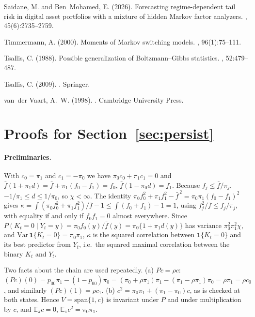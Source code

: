 \documentclass[12pt,letterpaper]{article}
\newcommand{\E}{\mathbb{E}}
\theoremstyle{plain}
\theoremstyle{remark}
\begin{document}
\begin{thebibliography}{}
Saidane, M. and Ben~Mohamed, E. (2026).
\newblock Forecasting regime-dependent tail risk in digital asset portfolios
  with a mixture of hidden {M}arkov factor analyzers.
, 45(6):2735--2759.

Timmermann, A. (2000).
\newblock Moments of {M}arkov switching models.
, 96(1):75--111.

Tsallis, C. (1988).
\newblock Possible generalization of {B}oltzmann--{G}ibbs statistics.
, 52:479--487.

Tsallis, C. (2009).
.
\newblock Springer.

van~der Vaart, A.~W. (1998).
.
\newblock Cambridge University Press.

\end{thebibliography}

\appendix
\section{Proofs for Section~\ref{sec:persist}}\label{app:C}

\paragraph{Preliminaries.} With $c_0=\pi_1$ and $c_1=-\pi_0$ we have $\pi_0c_0+\pi_1c_1=0$ and $\bar f(1+\pi_1d)=\bar f+\pi_1(f_0-f_1)=f_0$, $\bar f(1-\pi_0d)=f_1$. Because $f_j\le\bar f/\pi_j$, $-1/\pi_1\le d\le1/\pi_0$, so $\chi<\infty$. The identity $\pi_0f_0^2+\pi_1f_1^2-\bar f^{\,2}=\pi_0\pi_1(f_0-f_1)^2$ gives $\kappa=\int(\pi_0f_0^2+\pi_1f_1^2)/\bar f-1\le\int(f_0+f_1)-1=1$, using $f_j^2/\bar f\le f_j/\pi_j$, with equality if and only if $f_0f_1=0$ almost everywhere. Since $P(K_t=0\mid Y_t=y)=\pi_0f_0(y)/\bar f(y)=\pi_0\{1+\pi_1d(y)\}$ has variance $\pi_0^2\pi_1^2\chi$, and $\mathrm{Var}\,\mathbf 1\{K_t=0\}=\pi_0\pi_1$, $\kappa$ is the squared correlation between $\mathbf 1\{K_t=0\}$ and its best predictor from $Y_t$, i.e.\ the squared maximal correlation between the binary $K_t$ and $Y_t$.

Two facts about the chain are used repeatedly. (a) $Pc=\rho c$: $(Pc)(0)=p_{00}\pi_1-(1-p_{00})\pi_0=(\pi_0+\rho\pi_1)\pi_1-(\pi_1-\rho\pi_1)\pi_0=\rho\pi_1=\rho c_0$, and similarly $(Pc)(1)=\rho c_1$. (b) $c^2=\pi_0\pi_1+(\pi_1-\pi_0)c$, as is checked at both states. Hence $V=\mathrm{span}\{1,c\}$ is invariant under $P$ and under multiplication by $c$, and $\E_\pi c=0$, $\E_\pi c^2=\pi_0\pi_1$.
\end{document}
